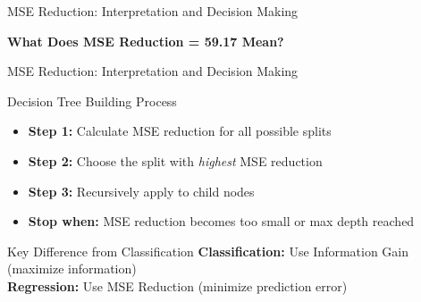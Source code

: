 \documentclass[usenames,dvipsnames]{beamer}
\begin{document}
\begin{frame}{MSE Reduction: Interpretation and Decision Making}
\scriptsize
\begin{keypointsbox}
\textbf{What Does MSE Reduction = 59.17 Mean?}
\end{keypointsbox}
\end{frame}

\begin{frame}{MSE Reduction: Interpretation and Decision Making}
\small
\begin{examplebox}{Decision Tree Building Process}
\begin{itemize}[<*>]
    \item \textbf{Step 1:} Calculate MSE reduction for all possible splits
    \item \textbf{Step 2:} Choose the split with \emph{highest} MSE reduction
    \item \textbf{Step 3:} Recursively apply to child nodes
    \item \textbf{Stop when:} MSE reduction becomes too small or max depth reached
\end{itemize}
\end{examplebox}

\pause
\begin{alertbox}{Key Difference from Classification}
\textbf{Classification:} Use Information Gain (maximize information)\\
\textbf{Regression:} Use MSE Reduction (minimize prediction error)
\end{alertbox}
\end{frame}
\end{document}
